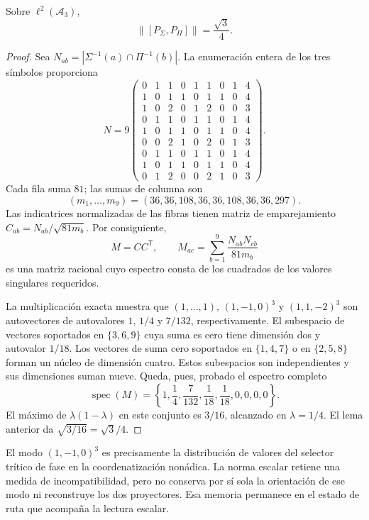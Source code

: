 \begin{proposition}
Sobre \(\ell^2(\mathcal A_3)\),
\begin{equation}
 \|[P_\Sigma,P_\Pi]\|=\frac{\sqrt3}{4}.
 \label{eq:el-prefactor}
\end{equation}
\end{proposition}
\begin{proof}
Sea \(N_{ab}=|\Sigma^{-1}(a)\cap\Pi^{-1}(b)|\). La enumeración entera
de los tres símbolos proporciona
\[
 N=9\begin{pmatrix}
 0&1&1&0&1&1&0&1&4\\
 1&0&1&1&0&1&1&0&4\\
 1&0&2&0&1&2&0&0&3\\
 0&1&1&0&1&1&0&1&4\\
 1&0&1&1&0&1&1&0&4\\
 0&0&2&1&0&2&0&1&3\\
 0&1&1&0&1&1&0&1&4\\
 1&0&1&1&0&1&1&0&4\\
 0&1&2&0&0&2&1&0&3
 \end{pmatrix}.
\]
Cada fila suma \(81\); las sumas de columna son
\[
 (m_1,\ldots,m_9)=(36,36,108,36,36,108,36,36,297).
\]
Las indicatrices normalizadas de las fibras tienen matriz de
emparejamiento \(C_{ab}=N_{ab}/\sqrt{81m_b}\). Por consiguiente,
\[
 M=CC^{\mathsf T},\qquad
 M_{ac}=\sum_{b=1}^9\frac{N_{ab}N_{cb}}{81m_b}
\]
es una matriz racional cuyo espectro consta de los cuadrados de los
valores singulares requeridos.

La multiplicación exacta muestra que \((1,\ldots,1)\),
\((1,-1,0)^3\) y \((1,1,-2)^3\) son autovectores de autovalores
\(1\), \(1/4\) y \(7/132\), respectivamente. El subespacio de
vectores soportados en \(\{3,6,9\}\) cuya suma es cero tiene dimensión
dos y autovalor \(1/18\). Los vectores de suma cero soportados en
\(\{1,4,7\}\) o en \(\{2,5,8\}\) forman un núcleo de dimensión
cuatro. Estos subespacios son independientes y sus dimensiones suman
nueve. Queda, pues, probado el espectro completo
\[
 \operatorname{spec}(M)=
 \left\{1,\frac14,\frac7{132},\frac1{18},\frac1{18},0,0,0,0\right\}.
\]
El máximo de \(\lambda(1-\lambda)\) en este conjunto es \(3/16\),
alcanzado en \(\lambda=1/4\). El lema anterior da
\(\sqrt{3/16}=\sqrt3/4\).
\end{proof}

El modo \((1,-1,0)^3\) es precisamente la distribución de valores del
selector trítico de fase en la coordenatización nonádica. La norma escalar retiene
una medida de incompatibilidad, pero no conserva por sí sola la
orientación de ese modo ni reconstruye los dos proyectores. Esa memoria
permanece en el estado de ruta que acompaña la lectura escalar.

